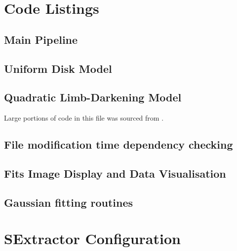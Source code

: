 
\providecommand{\pycode}[3]{
  \subsection{#1}
  
}

\providecommand{\configfile}[1]{
  
}
\section{Code Listings}

\pycode{Main Pipeline}{../pipeline.py}{pipeline.py}
\pycode{Uniform Disk Model}{../model/uniform_disk.py}{model/uniform\_disk.py}
\pycode{Quadratic Limb-Darkening Model}{../model/quad_limb.py}{model/quad\_limb.py}
Large portions of code in this file was sourced from \citep{mandel2002analytic}.
\pycode{File modification time dependency checking}{../common/dependency.py}{common/dependency.py}
\pycode{Fits Image Display and Data Visualisation}{../common/display.py}{common/display.py}
\pycode{Gaussian fitting routines}{../common/gaussian.py}{common/gaussian.py}

\section{SExtractor Configuration}

\configfile{../config.sex}

